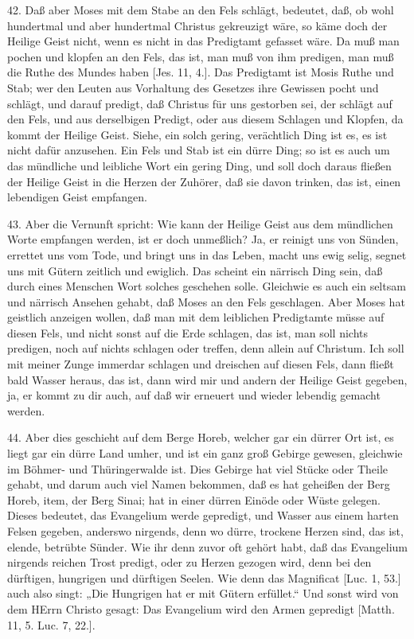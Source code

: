 42. Daß aber Moses mit dem Stabe an den Fels schlägt, bedeutet, daß, ob wohl hundertmal und aber hundertmal Christus gekreuzigt wäre, so käme doch der Heilige Geist nicht, wenn es nicht in das Predigtamt gefasset wäre. Da muß man pochen und klopfen an den Fels, das ist, man muß von ihm predigen, man muß die Ruthe des Mundes haben [Jes. 11, 4.]. Das Predigtamt ist Mosis Ruthe und Stab; wer den Leuten aus Vorhaltung des Gesetzes ihre Gewissen pocht und schlägt, und darauf predigt, daß Christus für uns gestorben sei, der schlägt auf den Fels, und aus derselbigen Predigt, oder aus diesem Schlagen und Klopfen, da kommt der Heilige Geist. Siehe, ein solch gering, verächtlich Ding ist es, es ist nicht dafür anzusehen. Ein Fels und Stab ist ein dürre Ding; so ist es auch um das mündliche und leibliche Wort ein gering Ding, und soll doch daraus fließen der Heilige Geist in die Herzen der Zuhörer, daß sie davon trinken, das ist, einen lebendigen Geist empfangen.

43. Aber die Vernunft spricht: Wie kann der Heilige Geist aus dem mündlichen Worte empfangen werden, ist er doch unmeßlich? Ja, er reinigt uns von Sünden, errettet uns vom Tode, und bringt uns in das Leben, macht uns ewig
selig, segnet uns mit Gütern zeitlich und ewiglich. Das scheint ein närrisch Ding sein, daß durch eines Menschen Wort solches geschehen solle. Gleichwie es auch ein seltsam und närrisch Ansehen gehabt, daß Moses an den Fels geschlagen. Aber Moses hat geistlich anzeigen wollen, daß man mit dem leiblichen Predigtamte müsse auf diesen Fels, und nicht sonst auf die Erde schlagen, das ist, man soll nichts predigen, noch auf nichts schlagen oder treffen, denn allein auf Christum. Ich soll mit meiner Zunge immerdar schlagen und dreischen auf diesen Fels, dann fließt bald Wasser heraus, das ist, dann wird mir und andern der Heilige Geist gegeben, ja, er kommt zu dir auch, auf daß wir erneuert und wieder lebendig gemacht werden.

44. Aber dies geschieht auf dem Berge Horeb, welcher gar ein dürrer Ort ist, es liegt gar ein dürre Land umher, und ist ein ganz groß Gebirge gewesen, gleichwie im Böhmer- und Thüringerwalde ist. Dies Gebirge hat viel Stücke oder Theile gehabt, und darum auch viel Namen bekommen, daß es hat geheißen der Berg Horeb, item, der Berg Sinai; hat in einer dürren Einöde oder Wüste gelegen. Dieses bedeutet, das Evangelium werde gepredigt, und Wasser aus einem harten Felsen gegeben, anderswo nirgends, denn wo dürre, trockene Herzen sind, das ist, elende, betrübte Sünder. Wie ihr denn zuvor oft gehört habt, daß das Evangelium nirgends reichen Trost predigt, oder zu Herzen gezogen wird, denn bei den dürftigen, hungrigen und dürftigen Seelen. Wie denn das Magnificat [Luc. 1, 53.] auch also singt: „Die Hungrigen hat er mit Gütern erfüllet.“ Und sonst wird von dem HErrn Christo gesagt: Das Evangelium wird den Armen gepredigt [Matth. 11, 5. Luc. 7, 22.].

